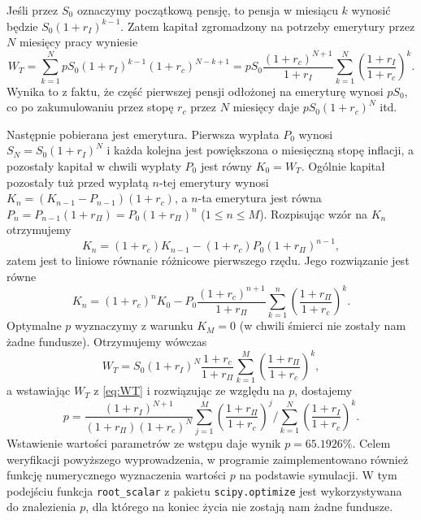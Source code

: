 \documentclass{article}
\begin{document}
Jeśli przez $S_0$ oznaczymy początkową pensję, to pensja w miesiącu $k$ wynosić będzie $S_0 (1+r_I)^{k - 1}$.
Zatem kapitał zgromadzony na potrzeby emerytury przez $N$ miesięcy pracy wyniesie
\begin{equation*}
    W_T = \sum_{k=1}^N pS_0(1+r_I)^{k-1}(1+r_c)^{N-k+1} = pS_0\frac{(1+r_c)^{N+1}}{1+r_I}\sum_{k=1}^N \left( \frac{1+r_I}{1+r_c} \right)^k.
\end{equation*}
Wynika to z faktu, że część pierwszej pensji odłożonej na emeryturę wynosi $p S_0$, co po zakumulowaniu przez stopę $r_c$ przez $N$ miesięcy daje $p S_0 (1+r_c)^N$ itd.

Następnie pobierana jest emerytura.
Pierwsza wypłata $P_0$ wynosi $S_N = S_0 (1+r_I)^N$ i każda kolejna jest powiększona o miesięczną stopę inflacji, a pozostały kapitał w chwili wypłaty $P_0$ jest równy $K_0 = W_T$.
Ogólnie kapitał pozostały tuż przed wypłatą $n$-tej emerytury wynosi $K_n = (K_{n-1} - P_{n-1})(1+r_c)$, a $n$-ta emerytura jest równa $P_n = P_{n-1}(1+r_\Pi) = P_0 (1+r_\Pi)^n$ ($1 \leq  n \leq M$).
Rozpisując wzór na $K_n$ otrzymujemy
\begin{equation}\label{eq:WT}
    K_n = (1+r_c)K_{n-1} - (1+r_c)P_0(1+r_\Pi)^{n-1},
\end{equation}
zatem jest to liniowe równanie różnicowe pierwszego rzędu.
Jego rozwiązanie jest równe
\begin{equation*}
    K_n = (1+r_c)^n K_0 - P_0 \frac{(1+r_c)^{n+1}}{1+r_\Pi} \sum_{k=1}^n \left( \frac{1+r_\Pi}{1+r_c} \right)^k.
\end{equation*}
Optymalne $p$ wyznaczymy z warunku $K_M = 0$ (w chwili śmierci nie zostały nam żadne fundusze).
Otrzymujemy wówczas
\begin{equation*}
    W_T = S_0 (1+r_I)^N\frac{1+r_c}{1+r_\Pi} \sum_{k=1}^M \left( \frac{1+r_\Pi}{1+r_c} \right)^k,
\end{equation*}
a wstawiając $W_T$ z \autoref{eq:WT} i rozwiązując ze względu na $p$, dostajemy
\begin{equation}\label{eq:p-exact-formula}
    p 
    = \frac{(1+r_I)^{N+1}}{(1+r_\Pi)(1+r_c)^N } \sum_{j=1}^M \left( \frac{1+r_\Pi}{1+r_c} \right)^j 
    \bigg/ \sum_{k=1}^N \left( \frac{1+r_I}{1+r_c} \right)^k.
\end{equation}
Wstawienie wartości parametrów ze wstępu daje wynik $p = 65.1926\%$.
Celem weryfikacji powyższego wyprowadzenia, w programie zaimplementowano również funkcję numerycznego wyznaczenia wartości $p$ na podstawie symulacji.
W tym podejściu funkcja \texttt{root\_scalar} z pakietu \texttt{scipy.optimize} jest wykorzystywana do znalezienia $p$, dla którego na koniec życia nie zostają nam żadne fundusze.
\end{document}

